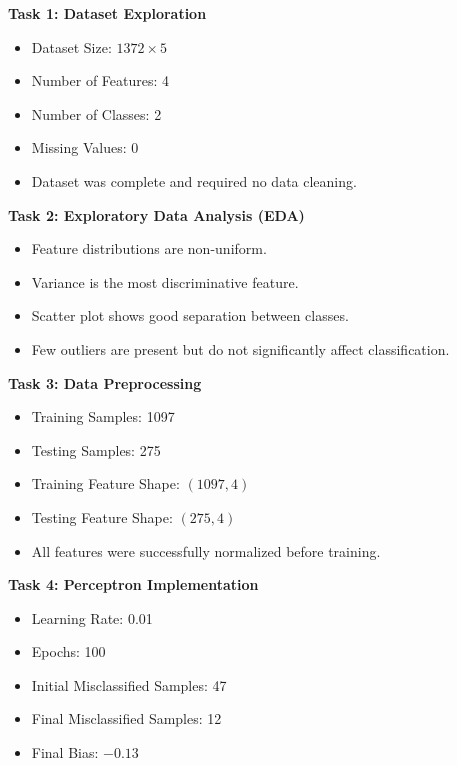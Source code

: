 \documentclass[11pt]{article}
\begin{document}
\textbf{Task 1: Dataset Exploration}

\begin{itemize}
\item Dataset Size: $1372 \times 5$
\item Number of Features: 4
\item Number of Classes: 2
\item Missing Values: 0
\item Dataset was complete and required no data cleaning.
\end{itemize}

\vspace{2mm}

\textbf{Task 2: Exploratory Data Analysis (EDA)}

\begin{itemize}
\item Feature distributions are non-uniform.
\item Variance is the most discriminative feature.
\item Scatter plot shows good separation between classes.
\item Few outliers are present but do not significantly affect classification.
\end{itemize}

\vspace{2mm}

\textbf{Task 3: Data Preprocessing}

\begin{itemize}
\item Training Samples: 1097
\item Testing Samples: 275
\item Training Feature Shape: $(1097, 4)$
\item Testing Feature Shape: $(275, 4)$
\item All features were successfully normalized before training.
\end{itemize}

\vspace{2mm}

\textbf{Task 4: Perceptron Implementation}

\begin{itemize}
\item Learning Rate: 0.01
\item Epochs: 100
\item Initial Misclassified Samples: 47
\item Final Misclassified Samples: 12
\item Final Bias: $-0.13$
\end{itemize}
\end{document}
